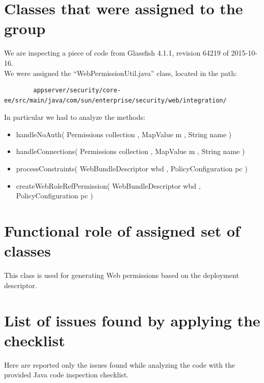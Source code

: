 \documentclass[a4paper,11pt]{report} %
\begin{document}
	\section{Classes that were assigned to the group} 
	We are inspecting a piece of code from Glassfish 4.1.1, revision 64219 of 2015-10-16.\\ \smallskip
	We were assigned the ``WebPermissionUtil.java'' class, located in the path:\
	\begin{verbatim}
		appserver/security/core-ee/src/main/java/com/sun/enterprise/security/web/integration/
	\end{verbatim}
	\bigskip
	In particular we had to analyze the methods:
	\begin{itemize}
		\item handleNoAuth( Permissions collection , MapValue m , String name )
		\item handleConnections( Permissions collection , MapValue m , String name )
		\item processConstraints( WebBundleDescriptor wbd , PolicyConfiguration pc )
		\item createWebRoleRefPermission( WebBundleDescriptor wbd , PolicyConfiguration pc )
	\end{itemize}
	
	\section{Functional role of assigned set of classes} This class is used for generating Web permissions based on the deployment descriptor.
	
	
	\section{List of issues found by applying the checklist} Here are reported only the issues found while analyzing the code with the provided Java code inspection checklist.
\end{document}
